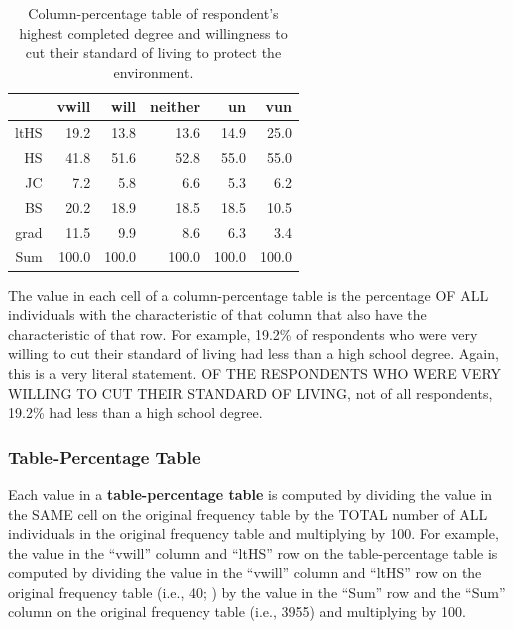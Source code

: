 \documentclass[10pt,openany]{book}\usepackage[]{graphicx}\usepackage[]{color}
\begin{document}
\begin{table}[ht]
\centering
\caption{Column-percentage table of respondent's highest completed degree and willingness to cut their standard of living to protect the environment.} 
\label{tab:EnvColP}
\begin{tabular}{rrrrrr}
  \hline
 & vwill & will & neither & un & vun \\ 
  \hline
ltHS & 19.2 & 13.8 & 13.6 & 14.9 & 25.0 \\ 
  HS & 41.8 & 51.6 & 52.8 & 55.0 & 55.0 \\ 
  JC & 7.2 & 5.8 & 6.6 & 5.3 & 6.2 \\ 
  BS & 20.2 & 18.9 & 18.5 & 18.5 & 10.5 \\ 
  grad & 11.5 & 9.9 & 8.6 & 6.3 & 3.4 \\ 
  Sum & 100.0 & 100.0 & 100.0 & 100.0 & 100.0 \\ 
   \hline
\end{tabular}
\end{table}


The value in each cell of a column-percentage table is the percentage OF ALL individuals with the characteristic of that column that also have the characteristic of that row.  For example, 19.2\% of respondents who were very willing to cut their standard of living had less than a high school degree.  Again, this is a very literal statement.  OF THE RESPONDENTS WHO WERE VERY WILLING TO CUT THEIR STANDARD OF LIVING, not of all respondents, 19.2\% had less than a high school degree.


\vspace{-12pt}

\subsubsection{Table-Percentage Table}
Each value in a \textbf{table-percentage table} is computed by dividing the value in the SAME cell on the original frequency table by the TOTAL number of ALL individuals in the original frequency table and multiplying by 100.  For example, the value in the ``vwill'' column and ``ltHS'' row on the table-percentage table  is computed by dividing the value in the ``vwill'' column and ``ltHS'' row on the original frequency table (i.e., 40; ) by the value in the ``Sum'' row and the ``Sum'' column on the original frequency table (i.e., 3955) and multiplying by 100.
\end{document}
